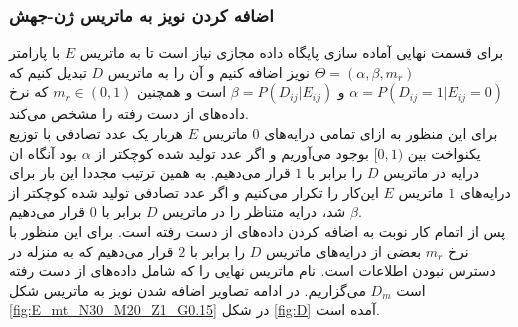 \subsubsection{اضافه کردن نویز به ماتریس ژن-جهش}
برای قسمت نهایی آماده سازی پایگاه داده مجازی نیاز است تا به ماتریس $E$ با پارامتر $\Theta=(\alpha, \beta, m_r)$ نویز اضافه کنیم و آن را به ماتریس $D$ تبدیل کنیم که $\alpha=P(D_{ij}=1|E_{ij}=0)$ و $\beta=P(D_{ij}|E_{ij})$ است و همچنین $m_r\in(0,1)$ که نرخ داده‌های از دست رفته را مشخص می‌کند.
\\
برای این منظور به ازای تمامی درایه‌های $0$ ماتریس $E$ هربار یک عدد تصادفی با توزیع یکنواخت بین $[0,1)$ بوجود می‌آوریم و اگر عدد تولید شده کوچکتر از $\alpha$ بود آنگاه ان درایه در ماتریس $D$ را برابر با $1$ قرار می‌دهیم. به همین ترتیب مجددا این بار برای درایه‌های $1$ ماتریس $E$ این‌کار را تکرار می‌کنیم و اگر عدد تصادفی تولید شده کوچکتر از $\beta$ شد، درایه متناظر را در ماتریس $D$ برابر با $0$ قرار می‌دهیم.
\\
پس از اتمام کار نوبت به اضافه کردن داده‌های از دست رفته است. برای این منظور با نرخ $m_r$ بعضی از درایه‌های ماتریس $D$ را برابر با $2$ قرار می‌دهیم که به منزله در دسترس نبودن اطلاعات است. نام ماتریس نهایی را که شامل داده‌های از دست رفته است $D_m$ می‌گزاریم. در ادامه تصاویر اضافه شدن نویز به ماتریس شکل \ref{fig:E_mt_N30_M20_Z1_G0.15} در شکل \ref{fig:D} آمده است.
